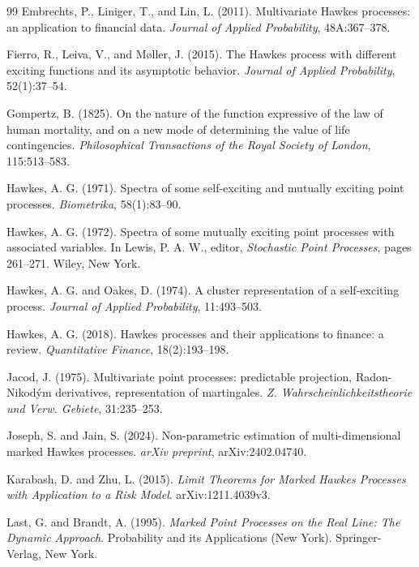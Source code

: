 \documentclass[12pt,a4paper]{report}
\theoremstyle{plain}
\theoremstyle{definition}
\theoremstyle{remark}
\newcommand{\1}{\mathbf{1}}
\begin{document}
\begin{thebibliography}{99}
Embrechts, P., Liniger, T., and Lin, L. (2011).
\newblock Multivariate Hawkes processes: an application to financial data.
\newblock \emph{Journal of Applied Probability}, 48A:367--378.

Fierro, R., Leiva, V., and M{\o}ller, J. (2015).
\newblock The Hawkes process with different exciting functions and its asymptotic behavior.
\newblock \emph{Journal of Applied Probability}, 52(1):37--54.

Gompertz, B. (1825).
\newblock On the nature of the function expressive of the law of human mortality, and on a new mode of determining the value of life contingencies.
\newblock \emph{Philosophical Transactions of the Royal Society of London}, 115:513--583.

Hawkes, A. G. (1971).
\newblock Spectra of some self-exciting and mutually exciting point processes.
\newblock \emph{Biometrika}, 58(1):83--90.

Hawkes, A. G. (1972).
\newblock Spectra of some mutually exciting point processes with associated variables.
\newblock In Lewis, P. A. W., editor, \emph{Stochastic Point Processes}, pages 261--271. Wiley, New York.

Hawkes, A. G. and Oakes, D. (1974).
\newblock A cluster representation of a self-exciting process.
\newblock \emph{Journal of Applied Probability}, 11:493--503.

Hawkes, A. G. (2018).
\newblock Hawkes processes and their applications to finance: a review.
\newblock \emph{Quantitative Finance}, 18(2):193--198.

Jacod, J. (1975).
\newblock Multivariate point processes: predictable projection, Radon-Nikod\'ym derivatives, representation of martingales.
\newblock \emph{Z. Wahrscheinlichkeitstheorie und Verw. Gebiete}, 31:235--253.

Joseph, S. and Jain, S. (2024).
\newblock Non-parametric estimation of multi-dimensional marked Hawkes processes.
\newblock \emph{arXiv preprint}, arXiv:2402.04740.

Karabash, D. and Zhu, L. (2015).
\newblock \emph{Limit Theorems for Marked Hawkes Processes with Application to a Risk Model}.
\newblock arXiv:1211.4039v3.

Last, G. and Brandt, A. (1995).
\newblock \emph{Marked Point Processes on the Real Line: The Dynamic Approach}.
\newblock Probability and its Applications (New York). Springer-Verlag, New York.


\end{thebibliography}
\end{document}
